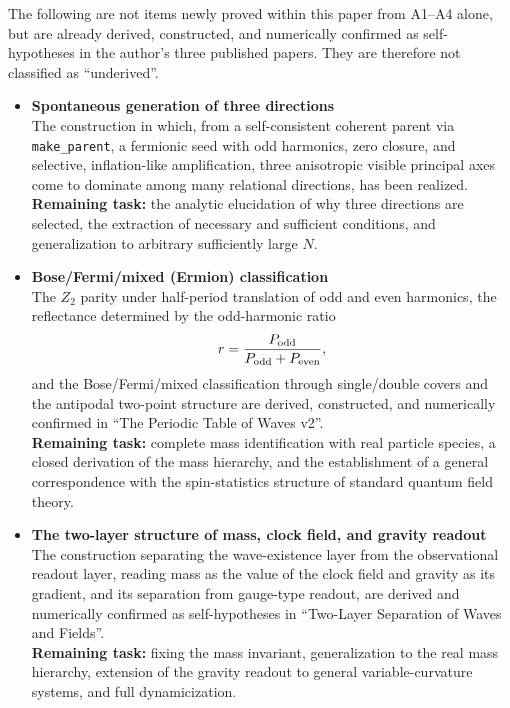 \documentclass[
  a4paper,
]{article}
\begin{document}
The following are not items newly proved within this paper from A1--A4
alone, but are already derived, constructed, and numerically confirmed
as self-hypotheses in the author's three published papers. They are
therefore not classified as ``underived''.

\begin{itemize}
\item
  \textbf{Spontaneous generation of three directions}\\
  The construction in which, from a self-consistent coherent parent via
  \texttt{make\_parent}, a fermionic seed with odd harmonics, zero
  closure, and selective, inflation-like amplification, three
  anisotropic visible principal axes come to dominate among many
  relational directions, has been realized.\\
  \textbf{Remaining task:} the analytic elucidation of why three
  directions are selected, the extraction of necessary and sufficient
  conditions, and generalization to arbitrary sufficiently large \(N\).
\item
  \textbf{Bose/Fermi/mixed (Ermion) classification}\\
  The \(Z_2\) parity under half-period translation of odd and even
  harmonics, the reflectance determined by the odd-harmonic ratio \[
  r=\frac{P_{\rm odd}}{P_{\rm odd}+P_{\rm even}},
  \] and the Bose/Fermi/mixed classification through single/double
  covers and the antipodal two-point structure are derived, constructed,
  and numerically confirmed in ``The Periodic Table of Waves v2''.\\
  \textbf{Remaining task:} complete mass identification with real
  particle species, a closed derivation of the mass hierarchy, and the
  establishment of a general correspondence with the spin-statistics
  structure of standard quantum field theory.
\item
  \textbf{The two-layer structure of mass, clock field, and gravity
  readout}\\
  The construction separating the wave-existence layer from the
  observational readout layer, reading mass as the value of the clock
  field and gravity as its gradient, and its separation from gauge-type
  readout, are derived and numerically confirmed as self-hypotheses in
  ``Two-Layer Separation of Waves and Fields''.\\
  \textbf{Remaining task:} fixing the mass invariant, generalization to
  the real mass hierarchy, extension of the gravity readout to general
  variable-curvature systems, and full dynamicization.

\end{itemize}
\end{document}
